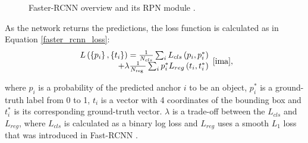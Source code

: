 \documentclass[english, 12pt, a4paper, elec, utf8, a-1b, online]{aaltothesis}
\begin{document}
\begin{figure}[htb]
    \centering
    \qquad
    \caption{Faster-RCNN overview and its RPN module \cite{ima}.}
    \label{fig:faster_rcnn}%
\end{figure}
\FloatBarrier

As the network returns the predictions, the loss function is calculated as in Equation \ref{faster_rcnn_loss}:  
\begin{equation}
\begin{array}{r}
L\left(\left\{p_{i}\right\},\left\{t_{i}\right\}\right)=\frac{1}{N_{c l s}} \sum_{i} L_{c l s}\left(p_{i}, p_{i}^{*}\right) \\
+\lambda \frac{1}{N_{\text {reg }}} \sum_{i} p_{i}^{*} L_{r e g}\left(t_{i}, t_{i}^{*}\right)
\end{array}
\label{faster_rcnn_loss} 
\cite{ima},
\end{equation}

where $p_i$ is a probability of the predicted anchor $i$ to be an object,  $p_{i}^{*}$ is a ground-truth label from 0 to 1, $t_i$ is a vector with 4 coordinates of the bounding box and $t_{i}^{*}$ is its corresponding ground-truth vector. $\lambda$ is a trade-off between the $L_{cls}$ and $L_{reg}$, where $L_{c l s}$ is calculated as a binary log loss and $L_{reg}$ uses a smooth $L_1$ loss that was introduced in Fast-RCNN \cite{Girshick2015}.  
\end{document}
